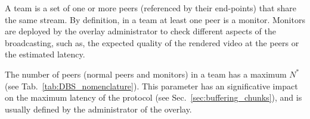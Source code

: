 

\label{sec:team_def}

A team is a set of one or more peers (referenced by their end-points)
that share the same stream. By definition, in a team at least one peer
is a \gls{monitor}. Monitors are deployed by the overlay administrator
to check different aspects of the broadcasting, such as, the expected
quality of the rendered video at the peers or the estimated latency.

The number of peers (normal peers and monitors) in a team has a
maximum $N^*$ (see Tab.~\ref{tab:DBS_nomenclature}). This parameter
has an significative impact on the maximum latency of the protocol (see
Sec.~\ref{sec:buffering_chunks}), and is usually defined by the
administrator of the overlay.



